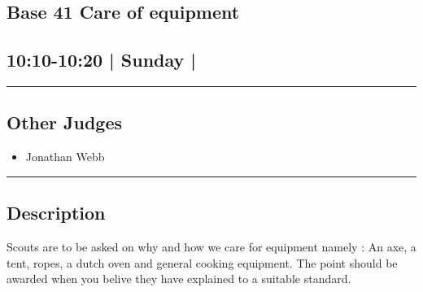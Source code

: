 \documentclass[10pt, A5]{article}
\begin{document}
		\begin{framed}
			\begin{minipage}{\textwidth}

			\setcounter{section}{98}
							\section{\faStar \: Base 41 \faStar \: Care of equipment}
						
			\subsection*{10:10-10:20 | Sunday | }

			\vspace{0.25cm}
			\hrule
			\vspace{0.25cm}


			\subsection*{Other Judges}
							

				\begin{multicols}{2}

			\begin{itemize}
											\item Jonathan Webb
								\end{itemize}

			\vfill\null
			\columnbreak

			\begin{itemize}
								\end{itemize}

			\vfill\null

			\end{multicols}

			\vspace{0.25cm}
			\hrule
			\vspace{0.25cm}

			\begin{minipage}{\textwidth}
			\subsection*{\faListAlt \: Description}
			Scouts are to be asked on why and how we care for equipment namely : An axe, a tent, ropes, a dutch oven and general cooking equipment. The point should be awarded when you belive they have explained to a suitable standard.
			\end{minipage}


	\end{minipage}
	\end{framed}
\end{document}
